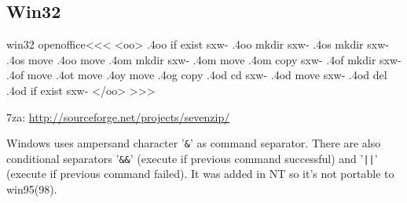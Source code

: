 \documentclass{article}
\begin{document}
\subsection{Win32}




\<win32 openoffice\><<<
<oo> 
.4oo if exist sxw-%
.4oo mkdir sxw-%
.4os mkdir sxw-%
.4os move  %
.4oo move  %
%
.4om mkdir sxw-%
.4om move  %
.4om copy  sxw-%
%
.4of mkdir sxw-%
.4of move  %
%
.4ot move  %
.4oy move  %
.4og copy  %
.4od cd    sxw-%
.4od move sxw-%
% 
.4od del %
.4od if exist sxw-%
</oo> 
>>>

7za: \url{http://sourceforge.net/projects/sevenzip/}

Windows uses ampersand character '\verb=&=' as command separator.
There are also conditional separators '\verb=&&=' (execute if previous
command successful) and '\verb=||=' (execute if previous command
failed). It was added in NT so it's not portable to win95(98).
\end{document}

